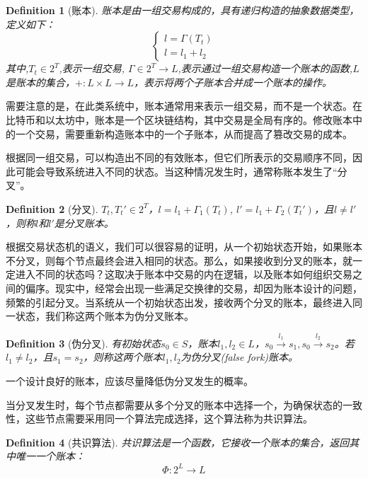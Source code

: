 \documentclass[UTF8,nofonts]{ctexart}
\newtheorem{definition}{Definition}[section]
\begin{document}
\begin{multicols}{2}
\begin{definition}[账本] \label{def-ledger}
账本是由一组交易构成的，具有递归构造的抽象数据类型，定义如下：
$$
\left\{\begin{matrix}
l = \Gamma(T_{t})\\ 
l = l_{1} + l_{2}
\end{matrix}\right.
$$
其中,$T_{t} \in 2^{T}$,表示一组交易, $\Gamma \in 2^{T} \rightarrow L$,表示通过一组交易构造一个账本的函数,$L$是账本的集合，$\boldsymbol{+}: L \times L \rightarrow L$，表示将两个子账本合并成一个账本的操作。
\end{definition}

需要注意的是，在此类系统中，账本通常用来表示一组交易，而不是一个状态。在比特币\cite{nakamoto2008bitcoin}和以太坊\cite{wood2014ethereum}中，账本是一个区块链结构，其中交易是全局有序的。修改账本中的一个交易，需要重新构造账本中的一个子账本，从而提高了篡改交易的成本。

根据同一组交易，可以构造出不同的有效账本，但它们所表示的交易顺序不同，因此可能会导致系统进入不同的状态。当这种情况发生时，通常称账本发生了“分叉”。
\begin{definition}[分叉] \label{def-fork}
$T_{t},{T_{t}}' \in 2^{T}$，$l=l_{1} + \Gamma_{1}(T_{t})$, ${l}'=l_{1}+\Gamma_{2}({T_{t}}')$，且$l \neq {l}'$，则称$l$和${l}'$是分叉账本。 
\end{definition}

根据交易状态机的语义，我们可以很容易的证明，从一个初始状态开始，如果账本不分叉，则每个节点最终会进入相同的状态。那么，如果接收到分叉的账本，就一定进入不同的状态吗？这取决于账本中交易的内在逻辑，以及账本如何组织交易之间的偏序。现实中，经常会出现一些满足交换律的交易，却因为账本设计的问题，频繁的引起分叉。当系统从一个初始状态出发，接收两个分叉的账本，最终进入同一状态，我们称这两个账本为伪分叉账本。

\begin{definition}[伪分叉] \label{def-falsefork}
有初始状态$s_{0} \in S$，账本$l_{1},l_{2} \in L$，$s_{0}\overset{l_{1}}{\rightarrow}s_{1}, s_{0}\overset{l_{2}}{\rightarrow}s_{2}$。若$l_{1} \neq l_{2}$，且$s_{1}=s_{2}$，则称这两个账本$l_{1} ,l_{2}$为伪分叉(false fork)账本。
\end{definition}

一个设计良好的账本，应该尽量降低伪分叉发生的概率。

当分叉发生时，每个节点都需要从多个分叉的账本中选择一个，为确保状态的一致性，这些节点需要采用同一个算法完成选择，这个算法称为共识算法。

\begin{definition}[共识算法] \label{def-consensus}
共识算法是一个函数，它接收一个账本的集合，返回其中唯一一个账本：
$$\Phi: 2^{L} \rightarrow L$$
\end{definition}


\end{multicols}
\end{document}
